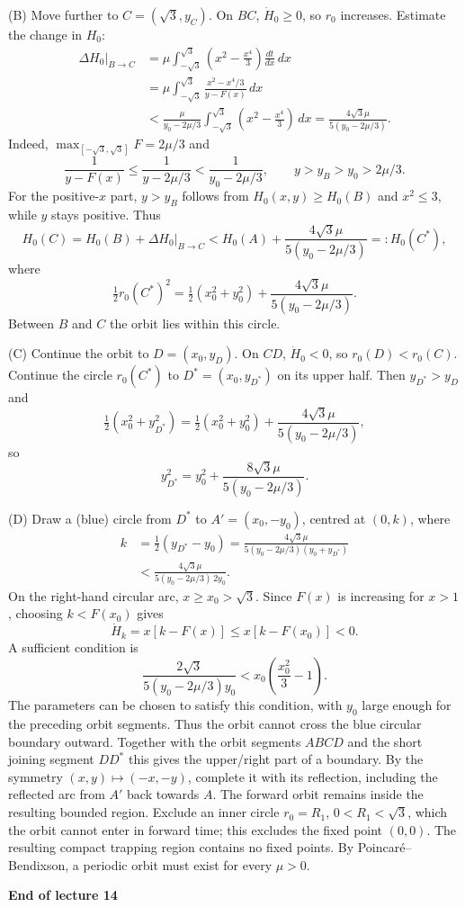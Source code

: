 \documentclass[11pt,a4paper]{article}
\begin{document}
\medskip
\noindent (B) Move further to $C=(\sqrt3,y_C)$. On $BC$,
$\dot H_0\geq0$, so $r_0$ increases. Estimate the change in $H_0$:
\[
\begin{aligned}
\Delta H_0\big|_{B\to C}
&=\mu\int_{-\sqrt3}^{\sqrt3}
\left(x^2-\frac{x^4}{3}\right)\frac{dt}{dx}\,dx\\
&=\mu\int_{-\sqrt3}^{\sqrt3}
\frac{x^2-x^4/3}{y-F(x)}\,dx\\
&<\frac{\mu}{y_0-2\mu/3}\int_{-\sqrt3}^{\sqrt3}
\left(x^2-\frac{x^4}{3}\right)\,dx
=\frac{4\sqrt3\mu}{5(y_0-2\mu/3)}.
\end{aligned}
\]
Indeed, $\max_{[-\sqrt3,\sqrt3]}F=2\mu/3$ and
\[
\frac1{y-F(x)}\leq\frac1{y-2\mu/3}<\frac1{y_0-2\mu/3},
\qquad y>y_B>y_0>2\mu/3.
\]
For the positive-$x$ part, $y>y_B$ follows from
$H_0(x,y)\geq H_0(B)$ and $x^2\leq3$, while $y$ stays positive.
Thus
\[
H_0(C)=H_0(B)+\Delta H_0\big|_{B\to C}
<H_0(A)+\frac{4\sqrt3\mu}{5(y_0-2\mu/3)}=:H_0(C^*),
\]
where
\[
\tfrac12r_0(C^*)^2
=\tfrac12(x_0^2+y_0^2)+\frac{4\sqrt3\mu}{5(y_0-2\mu/3)}.
\]
Between $B$ and $C$ the orbit lies within this circle.

\newpage
\noindent (C) Continue the orbit to $D=(x_0,y_D)$. On $CD$,
$\dot H_0<0$, so $r_0(D)<r_0(C)$. Continue the circle $r_0(C^*)$ to
$D^*=(x_0,y_{D^*})$ on its upper half. Then $y_{D^*}>y_D$ and
\[
\tfrac12(x_0^2+y_{D^*}^2)
=\tfrac12(x_0^2+y_0^2)+\frac{4\sqrt3\mu}{5(y_0-2\mu/3)},
\]
so
\[
\boxed{y_{D^*}^2=y_0^2+\frac{8\sqrt3\mu}{5(y_0-2\mu/3)}}.\tag{$*$}
\]

\medskip
\noindent (D) Draw a (blue) circle from $D^*$ to $A'=(x_0,-y_0)$,
centred at $(0,k)$, where
\[
\begin{aligned}
k&=\tfrac12(y_{D^*}-y_0)
=\frac{4\sqrt3\mu}{5(y_0-2\mu/3)(y_0+y_{D^*})}\\
&<\frac{4\sqrt3\mu}{5(y_0-2\mu/3)\,2y_0}.
\end{aligned}
\]
On the right-hand circular arc, $x\geq x_0>\sqrt3$. Since $F(x)$ is
increasing for $x>1$, choosing $k<F(x_0)$ gives
\[
\dot H_k=x[k-F(x)]\leq x[k-F(x_0)]<0.
\]
A sufficient condition is
\[
\frac{2\sqrt3}{5(y_0-2\mu/3)y_0}
<x_0\left(\frac{x_0^2}{3}-1\right).
\]
The parameters can be chosen to satisfy this condition, with $y_0$ large
enough for the preceding orbit segments.
Thus the orbit cannot cross the blue circular boundary outward.
Together with the orbit segments $ABCD$ and the short joining segment
$DD^*$ this gives the upper/right part of a boundary. By the symmetry
$(x,y)\mapsto(-x,-y)$, complete it with its reflection, including the
reflected arc from $A'$ back towards $A$.
The forward orbit remains inside the resulting bounded region.
Exclude an inner circle $r_0=R_1$, $0<R_1<\sqrt3$, which the orbit
cannot enter in forward time; this excludes the fixed point $(0,0)$.
The resulting compact trapping region contains no fixed points.
By Poincar\'e--Bendixson, a periodic orbit must exist for every $\mu>0$.
\begin{center}
\textbf{End of lecture 14}
\end{center}
\end{document}
